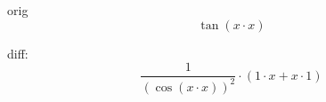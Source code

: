 \documentclass[a4paper, 12pt]{article}
\begin{document}
                          
orig \[  \tan {\left({x \cdot x}\right)}  \]

diff: \[ { \frac {1} {{\left( \cos {\left({x \cdot x}\right)} \right) ^ 2}} \cdot \left({{1 \cdot x} + {x \cdot 1}}\right)} \]
\end{document}
